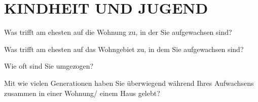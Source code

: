 
\section{\uppercase{Kindheit und Jugend}}
\vspace{.25cm}

\begin{choicequestion}[1]{Was trifft am ehesten auf die Wohnung zu, in der Sie aufgewachsen sind?}
\end{choicequestion}

\separate
\vspace{-.25cm}

\begin{choicequestion}[1]{Was trifft am ehesten auf das Wohngebiet zu, in dem Sie aufgewachsen sind?}
\end{choicequestion}

\separate
\vspace{-.25cm}

\begin{choicequestion}[6]{Wie oft sind Sie umgezogen?}
\end{choicequestion}

\separate
\vspace{-.25cm}

\begin{choicequestion}[1]{Mit wie vielen Generationen haben Sie überwiegend während Ihres Aufwachsens zusammen in einer Wohnung/ einem Haus gelebt?}
\end{choicequestion}

